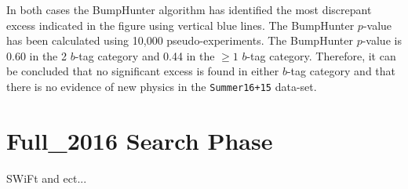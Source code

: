 In both cases the BumpHunter algorithm has identified the most discrepant excess indicated
in the figure using vertical blue lines.
The BumpHunter $p$-value has been calculated using 10,000 pseudo-experiments.
The BumpHunter $p$-value is 0.60 in the 2 $b$-tag category
and 0.44 in the $\geq1$ $b$-tag category.
Therefore, it can be concluded that no significant excess is found in either $b$-tag category
and that there is no evidence of new physics in the \verb|Summer16+15| data-set.

\section{Full\_2016 Search Phase}
\label{sec:bkg-full}

SWiFt and ect...
